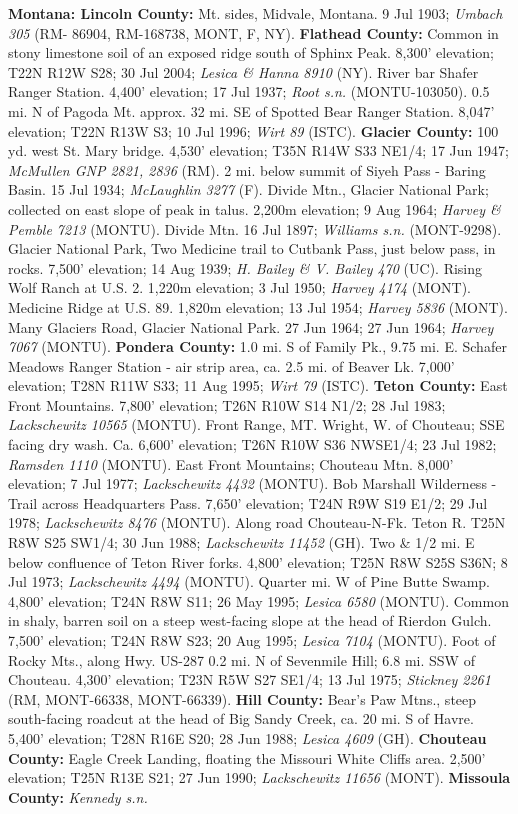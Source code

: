 \textbf{Montana: Lincoln County:}  Mt. sides, Midvale, Montana. 9 Jul 1903; \textit{Umbach 305} (RM- 86904, RM-168738, MONT, F, NY).  \textbf{Flathead County:}  Common in stony limestone soil of an exposed ridge south of Sphinx Peak. 8,300' elevation; T22N R12W S28; 30 Jul 2004; \textit{Lesica \& Hanna 8910} (NY).  River bar Shafer Ranger Station. 4,400' elevation; 17 Jul 1937; \textit{Root s.n.} (MONTU-103050).  0.5 mi. N of Pagoda Mt. approx. 32 mi. SE of Spotted Bear Ranger Station. 8,047' elevation; T22N R13W S3; 10 Jul 1996; \textit{Wirt 89} (ISTC).  \textbf{Glacier County:}  100 yd. west St. Mary bridge. 4,530' elevation; T35N R14W S33 NE1/4; 17 Jun 1947; \textit{McMullen GNP 2821, 2836} (RM).  2 mi. below summit of Siyeh Pass - Baring Basin. 15 Jul 1934; \textit{McLaughlin 3277} (F).  Divide Mtn., Glacier National Park; collected on east slope of peak in talus. 2,200m elevation; 9 Aug 1964; \textit{Harvey \& Pemble 7213} (MONTU).  Divide Mtn. 16 Jul 1897; \textit{Williams s.n.} (MONT-9298).  Glacier National Park, Two Medicine trail to Cutbank Pass, just below pass, in rocks. 7,500' elevation; 14 Aug 1939; \textit{H. Bailey \& V. Bailey 470} (UC).  Rising Wolf Ranch at U.S. 2. 1,220m elevation; 3 Jul 1950; \textit{Harvey 4174} (MONT).  Medicine Ridge at U.S. 89. 1,820m elevation; 13 Jul 1954; \textit{Harvey 5836} (MONT).  Many Glaciers Road, Glacier National Park. 27 Jun 1964; 27 Jun 1964; \textit{Harvey 7067} (MONTU).  \textbf{Pondera County:}  1.0 mi. S of Family Pk., 9.75 mi. E. Schafer Meadows Ranger Station - air strip area, ca. 2.5 mi. of Beaver Lk. 7,000' elevation; T28N R11W S33; 11 Aug 1995; \textit{Wirt 79} (ISTC).  \textbf{Teton County:}  East Front Mountains. 7,800' elevation; T26N R10W S14 N1/2; 28 Jul 1983; \textit{Lackschewitz 10565} (MONTU).  Front Range, MT. Wright, W. of Chouteau; SSE facing dry wash. Ca. 6,600' elevation; T26N R10W S36 NWSE1/4; 23 Jul 1982; \textit{Ramsden 1110} (MONTU).  East Front Mountains; Chouteau Mtn. 8,000' elevation; 7 Jul 1977; \textit{Lackschewitz 4432} (MONTU).  Bob Marshall Wilderness - Trail across Headquarters Pass. 7,650' elevation; T24N R9W S19 E1/2; 29 Jul 1978; \textit{Lackschewitz 8476} (MONTU).  Along road Chouteau-N-Fk. Teton R. T25N R8W S25 SW1/4; 30 Jun 1988; \textit{Lackschewitz 11452} (GH).  Two \& 1/2 mi. E below confluence of Teton River forks. 4,800' elevation; T25N R8W S25S S36N; 8 Jul 1973; \textit{Lackschewitz 4494} (MONTU).  Quarter mi. W of Pine Butte Swamp. 4,800' elevation; T24N R8W S11; 26 May 1995; \textit{Lesica 6580} (MONTU).  Common in shaly, barren soil on a steep west-facing slope at the head of Rierdon Gulch. 7,500' elevation; T24N R8W S23; 20 Aug 1995; \textit{Lesica 7104} (MONTU).  Foot of Rocky Mts., along Hwy. US-287 0.2 mi. N of Sevenmile Hill; 6.8 mi. SSW of Chouteau. 4,300' elevation; T23N R5W S27 SE1/4; 13 Jul 1975; \textit{Stickney 2261} (RM, MONT-66338, MONT-66339).  \textbf{Hill County:}  Bear's Paw Mtns., steep south-facing roadcut at the head of Big Sandy Creek, ca. 20 mi. S of Havre. 5,400' elevation; T28N R16E S20; 28 Jun 1988; \textit{Lesica 4609} (GH).  \textbf{Chouteau County:}  Eagle Creek Landing, floating the Missouri White Cliffs area. 2,500' elevation; T25N R13E S21; 27 Jun 1990; \textit{Lackschewitz 11656} (MONT).  \textbf{Missoula County:}  \textit{Kennedy s.n.} 